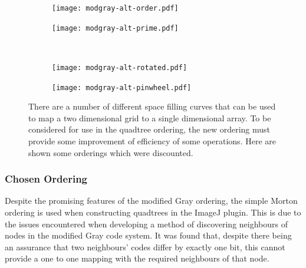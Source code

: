 \begin{figure}[tbhp]
	\centering
	\begin{subfigure}[b]{3.5cm}
		\texttt{[image: modgray-alt-order.pdf]}
		\caption{}\label{fig:modgray-alt-order.pdf}
	\end{subfigure}%
	\quad
	\begin{subfigure}[b]{3.5cm}
		\texttt{[image: modgray-alt-prime.pdf]}
		\caption{}\label{fig:modgray-alt-prime.pdf}
	\end{subfigure}
	\\[0.2cm]
	\begin{subfigure}[b]{3.5cm}
		\texttt{[image: modgray-alt-rotated.pdf]}
		\caption{}\label{fig:modgray-alt-rotated.pdf}
	\end{subfigure}%
	\quad
	\begin{subfigure}[b]{3.5cm}
		\texttt{[image: modgray-alt-pinwheel.pdf]}
		\caption{}\label{fig:modgray-alt-pinwheel.pdf}
	\end{subfigure}

	\caption[Alternative quadtree orderings.]{There are a number of different
		space filling curves that can be used to map a two dimensional grid to
		a single dimensional array. To be considered for use in the quadtree
		ordering, the new ordering must provide some improvement of efficiency
		of some operations. Here are shown some orderings which were
		discounted.}\label{fig:modgray-2-alternatives}
\end{figure}

\subsubsection{Chosen Ordering}
\label{ssub:Chosen Ordering}

Despite the promising features of the modified Gray ordering, the simple Morton
ordering is used when constructing quadtrees in the ImageJ plugin. This is due
to the issues encountered when developing a method of discovering neighbours of
nodes in the modified Gray code system. It was found that, despite there being
an assurance that two neighbours' codes differ by exactly one bit, this cannot
provide a one to one mapping with the required neighbours of that node.

